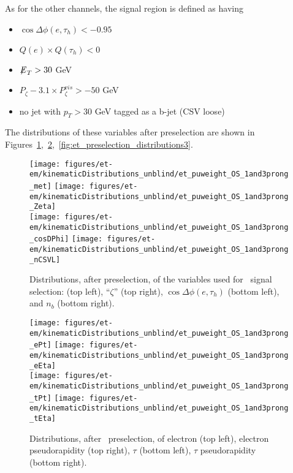 As for the other channels, the signal region is defined as having
\begin{itemize}
  \item $\cos{\Delta \phi (e,\tau_{h})}<-0.95$
  \item $Q(e) \times Q(\tau_{h}) < 0 $
  \item ${\not\mathrel{E}}_T>30$ GeV
  \item $P_{\zeta}- 3.1 \times P_{\zeta}^{vis} > -50$ GeV
  \item no jet with $p_T>30$ GeV tagged as a b-jet (CSV loose)
\end{itemize}

The distributions of these variables after preselection are shown in
Figures~\ref{fig:et_preselection_distributions1},~\ref{fig:et_preselection_distributions2},~\ref{fig:et_preselection_distributions3}.

\begin{figure}[thbp!]\centering
  \texttt{[image: figures/et-em/kinematicDistributions\_unblind/et\_puweight\_OS\_1and3prong\_met]}
  \texttt{[image: figures/et-em/kinematicDistributions\_unblind/et\_puweight\_OS\_1and3prong\_Zeta]} \\
  \texttt{[image: figures/et-em/kinematicDistributions\_unblind/et\_puweight\_OS\_1and3prong\_cosDPhi]}
  \texttt{[image: figures/et-em/kinematicDistributions\_unblind/et\_puweight\_OS\_1and3prong\_nCSVL]}
  \caption{\label{fig:et_preselection_distributions1} Distributions,
    after preselection, of the variables used for \teth ~signal
    selection: \ETslash (top left), ``$\zeta$'' (top right),
    $\cos{\Delta \phi (e,\tau_{h})}$ (bottom left), and $n_b$ (bottom
    right).}
\end{figure}

\begin{figure}[thbp!]\centering
  \texttt{[image: figures/et-em/kinematicDistributions\_unblind/et\_puweight\_OS\_1and3prong\_ePt]}
  \texttt{[image: figures/et-em/kinematicDistributions\_unblind/et\_puweight\_OS\_1and3prong\_eEta]} \\
  \texttt{[image: figures/et-em/kinematicDistributions\_unblind/et\_puweight\_OS\_1and3prong\_tPt]}
  \texttt{[image: figures/et-em/kinematicDistributions\_unblind/et\_puweight\_OS\_1and3prong\_tEta]}
  \caption{\label{fig:et_preselection_distributions2} Distributions,
    after \teth ~preselection, of electron \pt (top left), electron
    pseudorapidity (top right), $\tau$ \pt (bottom left), $\tau$
    pseudorapidity (bottom right).}
\end{figure}

